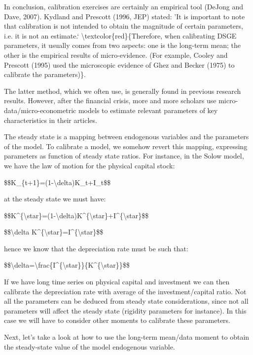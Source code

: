 \documentclass[10pt,math=newtx,citestyle=gb7714-2015,bibstyle=gb7714-2015]{elegantbook}
\begin{document}
	In conclusion, calibration exercises are certainly an empirical tool (DeJong and Dave, 2007). Kydland and Prescott (1996, JEP) stated: ’It is important to note that calibration is not intended to obtain the magnitude of certain parameters, i.e. it is not an estimate.‘ \textbackslash{}textcolor\{red\}\{Therefore, when calibrating DSGE parameters, it usually comes from two aspects: one is the long-term mean; the other is the empirical results of micro-evidence. (For example, Cooley and Prescott (1995) used the microscopic evidence of Ghez and Becker (1975) to calibrate the parameters)\}.
	
	The latter method, which we often use, is generally found in previous research results. However, after the financial crisis, more and more scholars use micro-data/micro-econometric models to estimate relevant parameters of key characteristics in their articles.
	
	The steady state is a mapping between endogenous variables and the parameters of the model. To calibrate a model, we somehow revert this mapping, expressing parameters as function of steady state ratios. For instance, in the Solow model, we have the law of motion for the physical capital stock:
	
	\$\$K\_\{t+1\}=(1-\textbackslash{}delta)K\_t+I\_t\$\$
	
	at the steady state we must have:
	
	\$\$K\^{}\{\textbackslash{}star\}=(1-\textbackslash{}delta)K\^{}\{\textbackslash{}star\}+I\^{}\{\textbackslash{}star\}\$\$
	
	\$\$\textbackslash{}delta K\^{}\{\textbackslash{}star\}=I\^{}\{\textbackslash{}star\}\$\$
	
	hence we know that the depreciation rate must be such that:
	
	\$\$\textbackslash{}delta=\textbackslash{}frac\{I\^{}\{\textbackslash{}star\}\}\{K\^{}\{\textbackslash{}star\}\}\$\$
	
	If we have long time series on physical capital and investment we can then calibrate the depreciation rate with average of the investment/capital ratio. Not all the parameters can be deduced from steady state considerations, since not all parameters will affect the steady state (rigidity parameters for instance). In this case we will have to consider other moments to calibrate these parameters.
	
	Next, let's take a look at how to use the long-term mean/data moment to obtain the steady-state value of the model endogenous variable.
	
\end{document}
